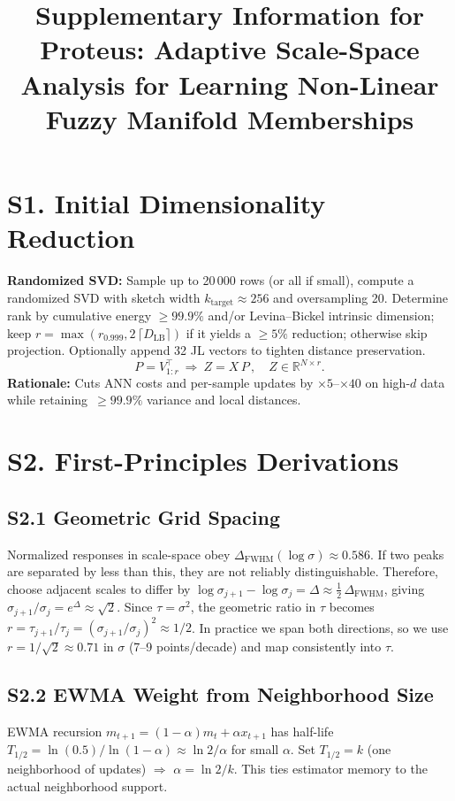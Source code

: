\documentclass[11pt]{article}
\title{Supplementary Information for\\ Proteus: Adaptive Scale-Space Analysis for Learning Non-Linear Fuzzy Manifold Memberships}
\author{}
\date{}
\begin{document}
\maketitle

\section*{S1. Initial Dimensionality Reduction}
\textbf{Randomized SVD:} Sample up to 20\,000 rows (or all if small), compute a randomized SVD with sketch width $k_{\mathrm{target}}\approx 256$ and oversampling 20. Determine rank by cumulative energy $\ge 99.9\%$ and/or Levina--Bickel intrinsic dimension; keep $r=\max(r_{0.999},2\,\lceil D_{\mathrm{LB}}\rceil)$ if it yields a $\ge 5\%$ reduction; otherwise skip projection. Optionally append 32 JL vectors to tighten distance preservation.
\[P=V_{1:r}^{\top}\ \Rightarrow\ Z = X\,P\,,\quad Z\in\mathbb R^{N\times r}.\]
\textbf{Rationale:} Cuts ANN costs and per-sample updates by $\times 5$--$\times 40$ on high-$d$ data while retaining \,$\ge 99.9\%$ variance and local distances.

\section*{S2. First-Principles Derivations}
\subsection*{S2.1 Geometric Grid Spacing}
Normalized responses in scale-space obey $\Delta_{\mathrm{FWHM}}(\log\sigma)\approx 0.586$. If two peaks are separated by less than this, they are not reliably distinguishable. Therefore, choose adjacent scales to differ by $\log\sigma_{j+1}-\log\sigma_j = \Delta \approx \tfrac{1}{2}\,\Delta_{\mathrm{FWHM}}$, giving $\sigma_{j+1}/\sigma_j = e^{\Delta}\approx \sqrt{2}$. Since $\tau=\sigma^2$, the geometric ratio in $\tau$ becomes $r=\tau_{j+1}/\tau_j = (\sigma_{j+1}/\sigma_j)^2 \approx 1/2$. In practice we span both directions, so we use $r=1/\sqrt{2}\approx 0.71$ in $\sigma$ (7--9 points/decade) and map consistently into $\tau$.

\subsection*{S2.2 EWMA Weight from Neighborhood Size}
EWMA recursion $m_{t+1}=(1{-}\alpha)m_t+\alpha x_{t+1}$ has half-life $T_{1/2}=\ln(0.5)/\ln(1{-}\alpha)\approx \ln 2/\alpha$ for small $\alpha$. Set $T_{1/2}{=}k$ (one neighborhood of updates) $\Rightarrow$ $\alpha=\ln 2/k$. This ties estimator memory to the actual neighborhood support.
\end{document}
